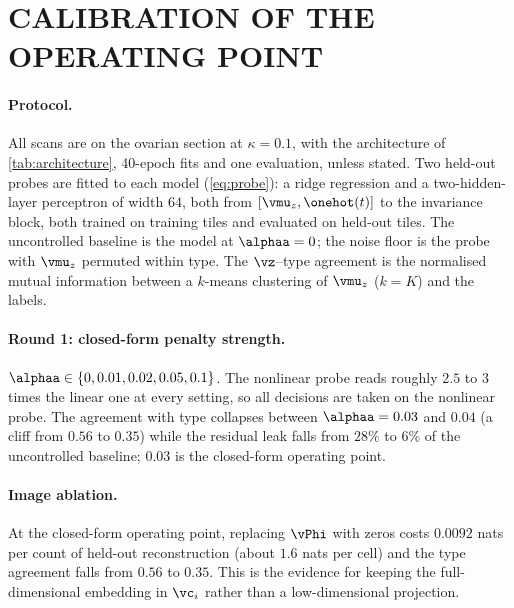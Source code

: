 \section{CALIBRATION OF THE OPERATING POINT}
\label{app:calibration}


\paragraph{Protocol.} All scans are on the ovarian section at $\kappa = 0.1$, with the architecture of \cref{tab:architecture}, 40-epoch fits and one evaluation, unless stated. Two held-out probes are fitted to each model (\cref{eq:probe}): a ridge regression and a two-hidden-layer perceptron of width $64$, both from $[\vmu_z, \onehot(t)]$ to the invariance block, both trained on training tiles and evaluated on held-out tiles. The uncontrolled baseline is the model at $\alphaa = 0$; the noise floor is the probe with $\vmu_z$ permuted within type. The $\vz$--type agreement is the normalised mutual information \citep{strehl2002} between a $k$-means clustering of $\vmu_z$ ($k = K$) and the labels.

\paragraph{Round 1: closed-form penalty strength.} $\alphaa \in \{0, 0.01, 0.02, 0.05, 0.1\}$. The nonlinear probe reads roughly $2.5$ to $3$ times the linear one at every setting, so all decisions are taken on the nonlinear probe. The agreement with type collapses between $\alphaa = 0.03$ and $0.04$ (a cliff from $0.56$ to $0.35$) while the residual leak falls from $28\%$ to $6\%$ of the uncontrolled baseline; $0.03$ is the closed-form operating point. 

\paragraph{Image ablation.} At the closed-form operating point, replacing $\vPhi$ with zeros costs $0.0092$ nats per count of held-out reconstruction (about $1.6$ nats per cell) and the type agreement falls from $0.56$ to $0.35$. This is the evidence for keeping the full-dimensional embedding in $\vc_i$ rather than a low-dimensional projection. 

